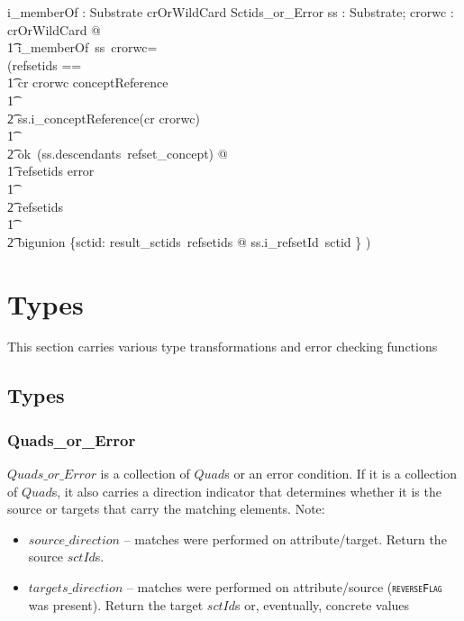 \documentclass{article}
\def\spec#1{{\tt \small \textsc{{#1}} }}
\begin{document}
\begin{axdef}
   i\_memberOf : Substrate \fun crOrWildCard \fun Sctids\_or\_Error 
\where
   \forall ss : Substrate; crorwc : crOrWildCard @ \\
   \t1 i\_memberOf~ss~crorwc= \\
(\LET refsetids == \\
\t1 \IF cr \inv crorwc \in conceptReference \\
\t1 \THEN \\
\t2 ss.i\_conceptReference(cr \inv crorwc) \\
\t1 \ELSE \\
\t2 ok~(ss.descendants~refset\_concept) @ \\
\t1 \IF refsetids \in \ran error \\
\t1 \THEN \\
\t2 refsetids \\
\t1 \ELSE \\
\t2 bigunion \{sctid: result\_sctids~refsetids @ ss.i\_refsetId~sctid \} )
\end{axdef}

\pagebreak

\section{Types}
This section carries various type transformations and error checking functions

\subsection{Types}

\subsubsection{Quads\_or\_Error}
$Quads\_or\_Error$ is a collection of $Quad$s or an error condition.  If it is a collection of $Quad$s, it also carries a direction indicator that determines
whether it is the source or targets that carry the matching elements.   Note:
\begin{itemize}[noitemsep,nolistsep]
\item \textbf{$source\_direction$} -- matches were performed on attribute/target. Return the source $sctId$s.
\item \textbf{$targets\_direction$} -- matches were performed on attribute/source (\spec{reverseFlag} was present).  Return the target $sctId$s or, eventually, concrete values
\end{itemize}
\end{document}
